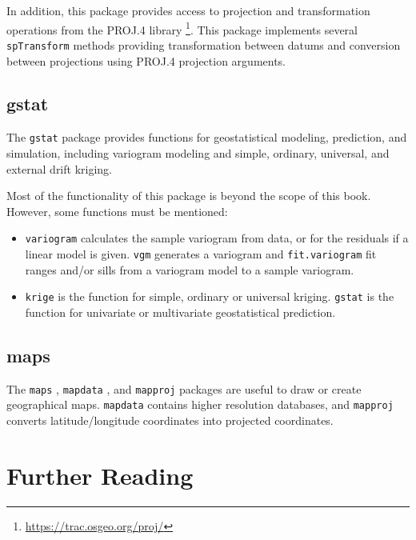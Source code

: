 \documentclass[smallroyalvopaper]{memoir}
\begin{document}
In addition, this package provides access to projection and transformation operations from the PROJ.4 library \footnote{\url{https://trac.osgeo.org/proj/}}. This package implements several \texttt{spTransform} methods providing transformation between datums and conversion between projections using PROJ.4 projection arguments.

\subsection{gstat}
\label{sec:orgheadline29}
\label{sec:gstat}

The \texttt{gstat} package \cite{Pebesma2004} provides functions for geostatistical modeling, prediction, and simulation, including variogram modeling and simple, ordinary, universal, and external drift kriging.

Most of the functionality of this package is beyond the scope of this book. However, some functions must be mentioned:

\begin{itemize}
\item \texttt{variogram} calculates the sample variogram from data, or for the residuals if a linear model is given. \texttt{vgm} generates a variogram and \texttt{fit.variogram} fit ranges and/or sills from a variogram model to a sample variogram.

\item \texttt{krige} is the function for simple, ordinary or universal kriging.  \texttt{gstat} is the function for univariate or multivariate geostatistical prediction.
\end{itemize}

\subsection{maps}
\label{sec:orgheadline30}
\label{sec:maps}

The \texttt{maps} \cite{Becker.Wilks.ea2013}, \texttt{mapdata} \cite{Becker.Wilks.ea2013b}, and \texttt{mapproj} \cite{McIlroy.Brownrigg.ea2013} packages are useful to draw or create geographical maps. \texttt{mapdata} contains higher resolution databases, and \texttt{mapproj} converts latitude/longitude coordinates into projected coordinates.

\section{Further Reading}
\label{sec:orgheadline32}
\label{cha:further-reading-spatial}
\end{document}
